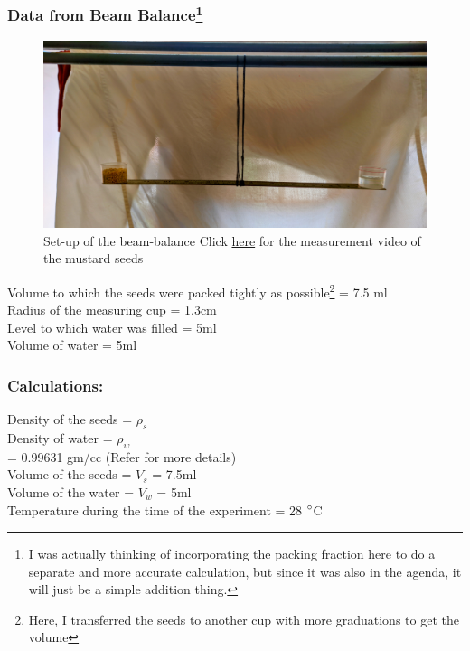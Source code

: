 \documentclass[twocolumn,11pt]{article}
\begin{document}
\subsubsection{Data from Beam Balance\footnote{I was actually thinking of incorporating the packing fraction here to do a separate and more accurate calculation, but since it was also in the agenda, it will just be a simple addition thing.}}
\begin{figure}[H]
    \centering
    \includegraphics[scale =0.05]{balance_mustard.jpg}
    \caption{Set-up of the beam-balance Click \href{https://drive.google.com/file/d/1gjN0wI8lRWEJ8fQ76qGaELFLVM8-Ln7-/view?usp=drive_link}{here} for the measurement video of the mustard seeds}
    \label{Set-up of the beam-balance}
\end{figure}
    Volume to which the seeds were packed tightly as possible\footnote{Here, I transferred the seeds to another cup with more graduations to get the volume} = 7.5 ml \\    
    Radius of the measuring cup = 1.3cm  \\
    Level to which water was filled = 5ml      \\ 
    Volume of water =    5ml       \\

\subsubsection{Calculations:}

    Density of the seeds = $\rho_s$\\
    Density of water = $\rho_w$\\ = 0.99631 gm/cc (Refer\cite{density_of_water_0-100_Celsius} for more details)\\
    Volume of the seeds = $V_s$ = 7.5ml \\
    Volume of the water = $V_w$ = 5ml\\
    Temperature during the time of the experiment = 28 $\degree$C\\
\end{document}
